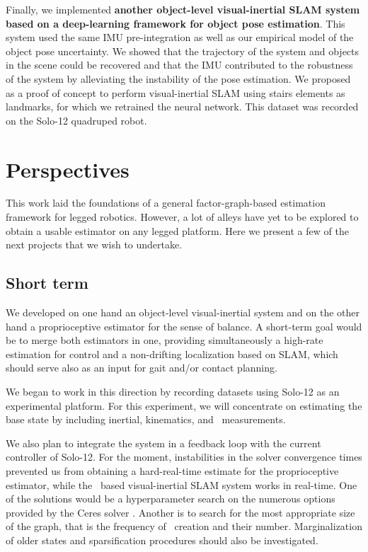 Finally, we implemented \textbf{another object-level visual-inertial SLAM system based on a deep-learning framework for object pose estimation}. This system  used the same 
IMU pre-integration as well as our empirical model of the object pose uncertainty. We showed that the trajectory of the system and objects
in the scene could be recovered and that the IMU contributed to the robustness of the system by alleviating the instability of the pose estimation. We proposed
as a proof of concept to perform visual-inertial SLAM using stairs elements as landmarks, for which we retrained the neural network. This dataset was recorded on the Solo-12 quadruped robot.


\section{Perspectives}
This work laid the foundations of a general factor-graph-based estimation framework for legged robotics. However, a lot of alleys have yet to be explored 
to obtain a usable estimator on any legged platform. Here we present a few of the next projects that we wish to undertake.

\subsection{Short term}
We developed on one hand an object-level visual-inertial system and on the other hand a proprioceptive estimator for the sense of balance. A short-term goal
would be to merge both estimators in one, providing simultaneously a high-rate estimation for control and a non-drifting localization based on SLAM, which should serve also as an input for gait and/or contact planning. 

We began to work in this direction by recording datasets using Solo-12 as an experimental platform. For this experiment, we will concentrate on estimating the 
base state by including inertial, kinematics, and \apriltag\ measurements. 

We also plan to integrate the system in a feedback loop with the current controller of Solo-12. For the moment, instabilities in the solver convergence times prevented
us from obtaining a hard-real-time estimate for the proprioceptive estimator, while the \apriltag\ based visual-inertial SLAM system works in real-time. One of the solutions would 
be a hyperparameter search on the numerous options provided by the Ceres solver \cite{ceres-solver}. Another is to search for the most appropriate size of the graph,
that is the frequency of \keyframe\ creation and their number. Marginalization of older states and sparsification procedures should also be investigated.



